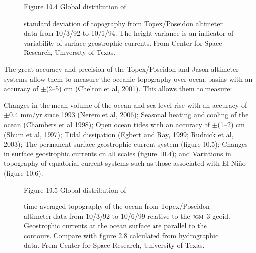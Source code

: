 \begin{figure}[t!]
\footnotesize
Figure 10.4 Global distribution of \rule{0mm}{3ex}standard deviation of topography from
Topex/Poseidon altimeter data from 10/3/92 to
10/6/94. The height variance is an indicator of variability of surface geostrophic
currents. From Center for Space Research,
University of Texas.
\label{fig:sshvariability}
\vspace{-4ex}
\end{figure}

The great accuracy and precision of the Topex/Poseidon and Jason altimeter systems allow them to measure the oceanic topography over ocean basins with an accuracy of $\pm$(2--5) cm (Chelton et al, 2001). This allows them to measure:
\begin{enumerate}
\vitem Changes in the mean volume of the ocean and sea-level rise with an accuracy of  $\pm 0.4$ mm/yr since 1993 (Nerem et al, 2006);
\vitem Seasonal heating and cooling of the ocean (Chambers et al 1998);
\vitem Open ocean tides with an accuracy of $\pm$(1--2) cm (Shum et al, 1997);
\vitem Tidal dissipation (Egbert and Ray, 1999; Rudnick et al, 2003);
\vitem The permanent surface geostrophic current system (figure 10.5);
\vitem Changes in surface geostrophic currents on all scales (figure 10.4); and
\vitem Variations in topography of equatorial current systems such as those associated with El Ni\~{n}o (figure 10.6).
\end{enumerate}

\begin{figure}[t!]
\footnotesize
Figure 10.5 Global distribution of \rule{0pt}{3ex} time-averaged topography of the
ocean from Topex/Pos\-eidon altimeter data from 10/3/92 to 10/6/99 relative to the
\textsc{jgm}--3 geoid. Geostrophic cur\-rents at the ocean surface are parallel to the contours. Compare with figure 2.8 calculated from
hydrographic data. From Center for Space Research, University of
Texas.
\label{fig:sshmean}
\vspace{-4ex}
\end{figure}

